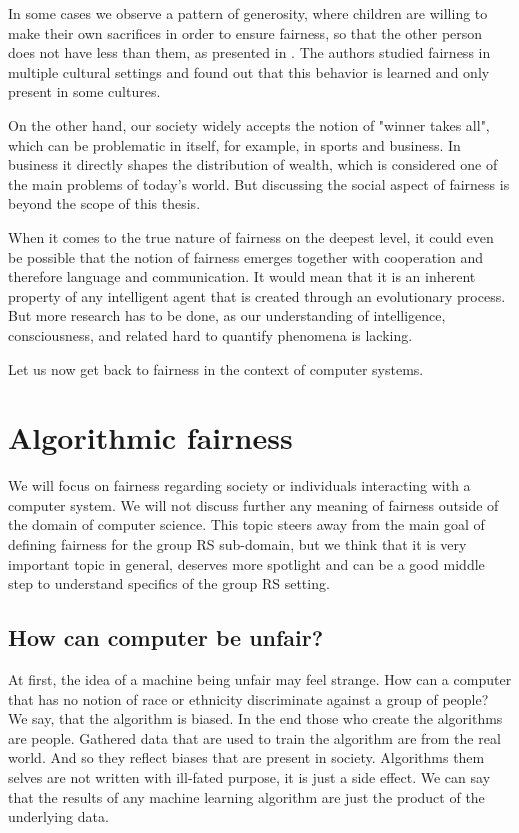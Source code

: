 In some cases we observe a pattern of generosity, where children are willing to make their own sacrifices in order to ensure fairness, so that the other person does not have less than them, as presented in \cite{children_generocity_blake}. The authors studied fairness in multiple cultural settings and found out that this behavior is learned and only present in some cultures.

On the other hand, our society widely accepts the notion of "winner takes all", which can be problematic in itself, for example, in sports and business. In business it directly shapes the distribution of wealth, which is considered one of the main problems of today's world. But discussing the social aspect of fairness is beyond the scope of this thesis.


When it comes to the true nature of fairness on the deepest level, it could even be possible that the notion of fairness emerges together with cooperation and therefore language and communication. It would mean that it is an inherent property of any intelligent agent that is created through an evolutionary process. But more research has to be done, as our understanding of intelligence, consciousness, and related hard to quantify phenomena is lacking.\newline

Let us now get back to fairness in the context of computer systems.


\section{Algorithmic fairness}\label{subsec:02_general.algorithmic_fairness_and_possible_meanings}
We will focus on fairness regarding society or individuals interacting with a computer system. We will not discuss further any meaning of fairness outside of the domain of computer science. This topic steers away from the main goal of defining fairness for the group RS sub-domain, but we think that it is very important topic in general, deserves more spotlight and can be a good middle step to understand specifics of the group RS setting.

\subsection{How can computer be unfair?}
At first, the idea of a machine being unfair may feel strange. How can a computer that has no notion of race or ethnicity discriminate against a group of people? We say, that the algorithm is biased. In the end those who create the algorithms are people. Gathered data that are used to train the algorithm are from the real world. And so they reflect biases that are present in society. Algorithms them selves are not written with ill-fated purpose, it is just a side effect. We can say that the results of any machine learning algorithm are just the product of the underlying data.

